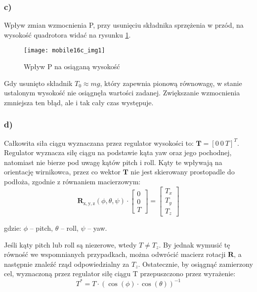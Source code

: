\documentclass[11pt, a4paper]{article}
\begin{document}
\subsubsection*{c)}

Wpływ zmian wzmocnienia P, przy usunięciu składnika sprzężenia w przód, na wysokość quadrotora widać na rysunku \ref{fig:mobile16c}.
\begin{figure}[htb!]
	\centering
	\texttt{[image: mobile16c\_img1]}
	\caption{Wpływ P na osiąganą wysokość \label{fig:mobile16c}}
\end{figure}

Gdy usunięto składnik $T_0 \approx mg$, który zapewnia pionową równowagę, w stanie ustalonym wysokość nie osiągnęła wartości zadanej. Zwiększanie wzmocnienia zmniejsza ten błąd, ale i tak cały czas występuje.

\subsubsection*{d)}

Całkowita siła ciągu wyznaczana przez regulator wysokości to: $\mathbf{T} = \left[0 \ 0 \ T \right]^{T}$. Regulator wyznacza siłę ciągu na podstawie kąta yaw oraz jego pochodnej, natomiast nie bierze pod uwagę kątów pitch i roll. Kąty te wpływają na orientację wirnikowca, przez co wektor $\mathbf{T}$ nie jest skierowany prostopadle do podłoża, zgodnie z równaniem macierzowym:
\begin{equation*}
\mathbf{R}_{\text{x}, \text{y}, \text{z}}(\phi, \theta, \psi) \cdot
	\begin{bmatrix}
	0 \\ 0 \\ T
	\end{bmatrix}
	=
	\begin{bmatrix}
	T_x \\ T_y \\ T_z
	\end{bmatrix}
\end{equation*}

gdzie: $\phi$ -- pitch, $\theta$ -- roll, $\psi$ -- yaw.

Jeśli kąty pitch lub roll są niezerowe, wtedy $T \neq T_z$. By jednak wymusić tę równość we wspomnianych przypadkach, można odwrócić macierz rotacji $\mathbf{R}$, a następnie znaleźć rząd odpowiedzialny za $T_z$. Ostatecznie, by osiągnąć zamierzony cel, wyznaczoną przez regulator siłę ciągu T przepuszczono przez wyrażenie:
\begin{equation*}
T^{*} = T \cdot \left( \cos(\phi) \cdot \cos(\theta) \right)^{-1}
\end{equation*}
\end{document}
